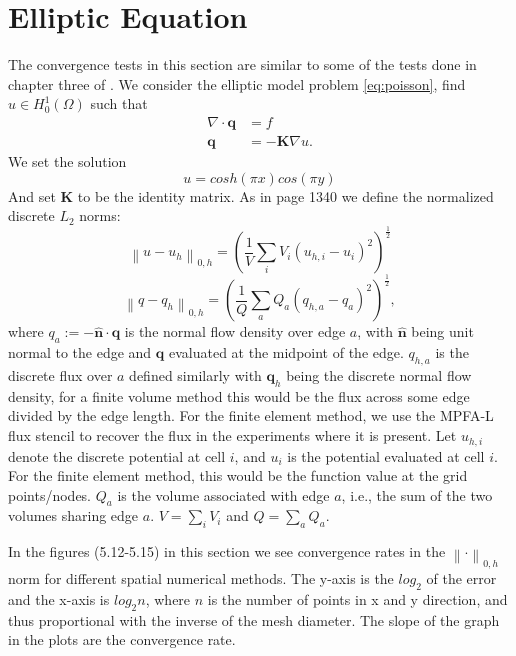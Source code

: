 \documentclass[../Main/main.tex]{subfiles}
\begin{document}
		\section{Elliptic Equation}
		\label{sec:elliptic_numerical}
		The convergence tests in this section are similar to some of the tests done in chapter three of \cite{https://doi.org/10.1002/num.20320}. We consider the elliptic model problem \eqref{eq:poisson}, find $u\in H^1_0(\Omega)$ such that
		\begin{equation} \label{eq:model}
			\begin{split}
				\nabla \cdot \bm{q} &= f \\
				\bm{q} &= -\bm{K}\nabla u.
			\end{split}
		\end{equation}
		We set the solution
		\begin{equation}\label{eq:pressure_solution_model}
			u = cosh(\pi x)cos(\pi y)
		\end{equation} 
		And set $\bm{K}$ to be the identity matrix. 
		As in \cite{https://doi.org/10.1002/num.20320} page 1340 we define the normalized discrete $L_2$ norms:
		\begin{equation}
			\left \| u - u_h \right \|_{0,h} =  \left (  \frac{1}{V}\sum_i V_i(u_{h,i}-u_i)^2\right )^{\frac{1}{2}}
		\end{equation}
		\begin{equation}\label{eq:normal_flow_density}
			\left \| q - q_h \right \|_{0,h} =  \left (  \frac{1}{Q}\sum_a Q_a(q_{h,a}-q_a)^2\right )^{\frac{1}{2}},
		\end{equation}
		where $q_a := -\bm{\hat{n}} \cdot \bm{q}$ is the normal flow density over edge $a$, with $\bm{\hat{n}}$ being unit normal to the edge and $\bm q$ evaluated at the midpoint of the edge. $q_{h,a}$ is the discrete flux over $a$ defined similarly with $\bm{q}_h$ being the discrete normal flow density, for a finite volume method this would be the flux across some edge divided by the edge length. 
		For the finite element method, we use the MPFA-L flux stencil to recover the flux in the experiments where it is present.
		 Let $u_{h,i}$ denote the discrete potential at cell $i$, and $u_i$ is the potential evaluated at cell $i$. For the finite element method, this would be the function value at the grid points/nodes. $Q_a$ is the volume associated with edge $a$, i.e., the sum of the two volumes sharing edge $a$. $V = \sum_{i} V_i$ and $Q = \sum_{a} Q_a$.
		\par 
		In the figures (5.12-5.15) in this section we see convergence rates in the $\left \| \cdot \right \|_{0,h}$ norm for different spatial numerical methods. The y-axis is the $log_2$ of the error and the x-axis is $log_2n$, where $n$ is the number of points in x and y direction, and thus proportional with the inverse of the mesh diameter. The slope of the graph in the plots are the convergence rate.
\end{document}
